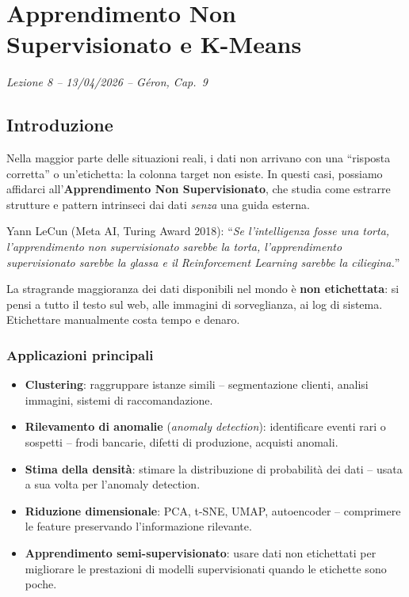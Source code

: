 \chapter{Apprendimento Non Supervisionato e K-Means}
\begin{flushright}\small\textit{Lezione 8 -- 13/04/2026 -- G\'eron, Cap.\ 9}\end{flushright}

\section{Introduzione}

Nella maggior parte delle situazioni reali, i dati non arrivano con una ``risposta corretta'' o un'etichetta: la colonna target non esiste. In questi casi, possiamo affidarci all'\textbf{Apprendimento Non Supervisionato}, che studia come estrarre strutture e pattern intrinseci dai dati \emph{senza} una guida esterna.

\begin{notebox}
Yann LeCun (Meta AI, Turing Award 2018): ``\emph{Se l'intelligenza fosse una torta, l'apprendimento non supervisionato sarebbe la torta, l'apprendimento supervisionato sarebbe la glassa e il Reinforcement Learning sarebbe la ciliegina.}''

La stragrande maggioranza dei dati disponibili nel mondo è \textbf{non etichettata}: si pensi a tutto il testo sul web, alle immagini di sorveglianza, ai log di sistema. Etichettare manualmente costa tempo e denaro.
\end{notebox}

\subsection{Applicazioni principali}

\begin{itemize}
    \item \textbf{Clustering}: raggruppare istanze simili -- segmentazione clienti, analisi immagini, sistemi di raccomandazione.
    \item \textbf{Rilevamento di anomalie} (\emph{anomaly detection}): identificare eventi rari o sospetti -- frodi bancarie, difetti di produzione, acquisti anomali.
    \item \textbf{Stima della densità}: stimare la distribuzione di probabilità dei dati -- usata a sua volta per l'anomaly detection.
    \item \textbf{Riduzione dimensionale}: PCA, t-SNE, UMAP, autoencoder -- comprimere le feature preservando l'informazione rilevante.
    \item \textbf{Apprendimento semi-supervisionato}: usare dati non etichettati per migliorare le prestazioni di modelli supervisionati quando le etichette sono poche.
\end{itemize}

